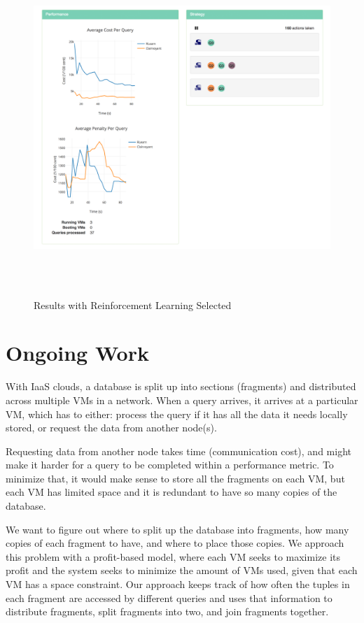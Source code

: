 \documentclass{brandiss}
\numberwithin{section}{chapter}
\numberwithin{figure}{chapter}
\theoremstyle{definition}
\theoremstyle{plain}
\theoremstyle{remark}
\begin{document}
\begin{figure}[htbp]
  \centering
  \includegraphics[height=5in]{demo-reinforcement}
  \caption{Results with Reinforcement Learning Selected}
  \label{fig:demo-reinforcement}
\end{figure}

\chapter{Ongoing Work}

With IaaS clouds, a database is split up into sections (fragments) and distributed across multiple VMs in a network. When a query arrives, it arrives at a particular VM, which has to either: process the query if it has all the data it needs locally stored, or request the data from another node(s).

Requesting data from another node takes time (communication cost), and might make it harder for a query to be completed within a performance metric. To minimize that, it would make sense to store all the fragments on each VM, but each VM has limited space and it is redundant to have so many copies of the database.

We want to figure out where to split up the database into fragments, how many copies of each fragment to have, and where to place those copies. We approach this problem with a profit-based model, where each VM seeks to maximize its profit and the system seeks to minimize the amount of VMs used, given that each VM has a space constraint. Our approach keeps track of how often the tuples in each fragment are accessed by different queries and uses that information to distribute fragments, split fragments into two, and join fragments together. 
\end{document}
